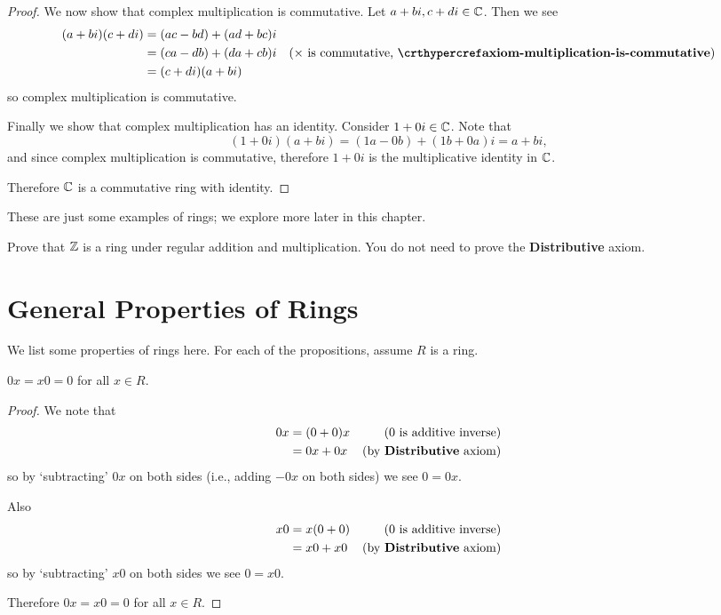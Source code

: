 \begin{proof}
    \newpage

    We now show that complex multiplication is commutative. Let $a+bi, c+di \in \mathbb{C}$. Then we see
    \begin{align*}
        (a+bi)(c+di) &= (ac-bd) + (ad+bc)i\\
        &= (ca-db) + (da+cb)i & (\times\text{ is commutative, } \myref{axiom-multiplication-is-commutative})\\
        &= (c+di)(a+bi)
    \end{align*}
    so complex multiplication is commutative.

    Finally we show that complex multiplication has an identity. Consider $1 + 0i \in \mathbb{C}$. Note that
    \[
        (1+0i)(a+bi) = (1a-0b) + (1b+0a)i = a+bi,
    \]
    and since complex multiplication is commutative, therefore $1+0i$ is the multiplicative identity in $\mathbb{C}$.

    Therefore $\mathbb{C}$ is a commutative ring with identity.
\end{proof}

These are just some examples of rings; we explore more later in this chapter.
\begin{exercise}\label{exercise-ring-of-integers-is-a-ring}
    Prove that $\mathbb{Z}$ is a ring under regular addition and multiplication. You do not need to prove the \textbf{Distributive} axiom.
\end{exercise}

\section{General Properties of Rings}
We list some properties of rings here. For each of the propositions, assume $R$ is a ring.

\begin{proposition}\label{prop-multiplying-by-zero-is-zero}
    $0x = x0 = 0$ for all $x \in R$.
\end{proposition}
\begin{proof}
    We note that
    \begin{align*}
        0x &= (0 + 0)x & (0 \text{ is additive inverse})\\
        &= 0x + 0x & (\text{by \textbf{Distributive} axiom})
    \end{align*}
    so by `subtracting' $0x$ on both sides (i.e., adding $-0x$ on both sides) we see $0 = 0x$.

    Also
    \begin{align*}
        x0 &= x(0 + 0) & (0 \text{ is additive inverse})\\
        &= x0 + x0 & (\text{by \textbf{Distributive} axiom})
    \end{align*}
    so by `subtracting' $x0$ on both sides we see $0 = x0$.

    Therefore $0x = x0 = 0$ for all $x \in R$.
\end{proof}

